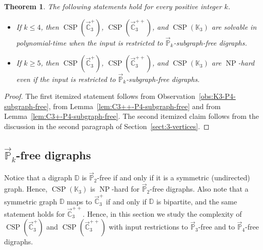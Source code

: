 \documentclass{article}
\newtheorem{theorem}{Theorem}
\theoremstyle{definition}
\theoremstyle{remark}
\DeclareMathOperator{\NP}{NP}
\DeclareMathOperator{\CSP}{CSP}
\newcommand{\bC}{{\mathbb C}}
\newcommand{\bD}{{\mathbb D}}
\newcommand{\bK}{{\mathbb K}}
\newcommand{\bP}{{\mathbb P}}
\begin{document}
\begin{theorem}\label{thm:3-vertices-Pk-subgraph-free}
    The following statements hold for every positive integer $k$.
    \begin{itemize}
        \item If $k\le 4$, then $\CSP(\vec{\bC}_3^+)$, $\CSP(\vec{\bC}_3^{++})$, and $\CSP(\bK_3)$ are solvable in polynomial-time
        when the input is restricted to $\vec{\bP}_k$-subgraph-free digraphs. 
        \item If $k\ge 5$, then $\CSP(\vec{\bC}_3^+)$, $\CSP(\vec{\bC}_3^{++})$, and $\CSP(\bK_3)$ are $\NP$-hard even
        if the input is restricted to $\vec{\bP}_k$-subgraph-free digraphs.
    \end{itemize}
\end{theorem}
\begin{proof}
    The first itemized statement follows from Observation~\ref{obs:K3-P4-subgraph-free}, from
    Lemma~\ref{lem:C3++-P4-subgraph-free} and from Lemma~\ref{lem:C3+-P4-subgraph-free}. The second
    itemized claim follows from the  discussion in the second paragraph of Section~\ref{sect:3-vertices}.
\end{proof}



\subsection{$\vec{\bP}_k$-free digraphs}

Notice that a digraph $\bD$ is $\vec{\bP}_2$-free if and only if it is a symmetric (undirected) graph.
Hence,  $\CSP(\bK_3)$ is $\NP$-hard for $\vec{\bP}_2$-free digraphs. Also note that a symmetric
graph $\bD$ maps to $\vec{\bC}_3^+$ if and only if $\bD$ is bipartite, and the same statement holds
for $\vec{\bC}_3^{++}$. Hence, in this section we study the complexity of $\CSP(\vec{\bC}_3^+)$
and $\CSP(\vec{\bC}_3^{++})$ with input restrictions to $\vec{\bP}_3$-free and to 
$\vec{\bP}_4$-free digraphs.
\end{document}
